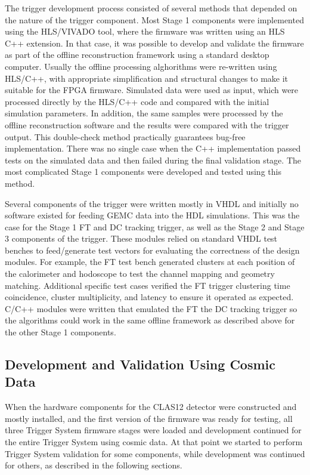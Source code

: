The trigger development process consisted of several methods that depended on the nature of the trigger component. Most Stage 1 components were implemented using the HLS/VIVADO tool, where the firmware was written using an HLS C++ extension. In that case, it was possible to develop and validate the firmware as part of the offline reconstruction framework using a standard desktop computer. Usually the offline processing alghorithms were re-written using HLS/C++, with appropriate simplification and structural changes to make it suitable for the FPGA firmware. Simulated data were used as input, which were processed directly by the HLS/C++ code and compared with the initial simulation parameters. In addition, the same samples were processed by the offline reconstruction software and the results were compared with the trigger output. This double-check method practically guarantees bug-free implementation. There was no single case when the C++ implementation passed tests on the simulated data and then failed during the final validation stage. The most complicated Stage 1 components were developed and tested using this method.

Several components of the trigger were written mostly in VHDL and initially no software existed for feeding GEMC data into the HDL simulations. This was the case for the Stage 1 FT and DC tracking trigger, as well as the Stage 2 and Stage 3 components of the trigger. These modules relied on standard VHDL test benches to feed/generate test vectors for evaluating the correctness of the design modules. For example, the FT test bench generated clusters at each position of the calorimeter and hodoscope to test the channel mapping and geometry matching. Additional specific test cases verified the FT trigger clustering time coincidence, cluster multiplicity, and latency to ensure it operated as expected. C/C++ modules were written that emulated the FT the DC tracking trigger so the algorithms could work in the same offline framework as described above for the other Stage 1 components.

\subsection{Development and Validation Using Cosmic Data}

When the hardware components for the CLAS12 detector were constructed and mostly installed, and the first version of the firmware was ready for testing, all three Trigger System firmware stages were loaded and development continued for the entire Trigger System using cosmic data. At that point we started to perform Trigger System validation for some components, while development was continued for others, as described in the following sections.

